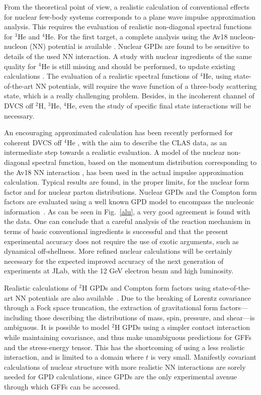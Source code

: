 From the theoretical point of view, a realistic calculation 
of conventional effects for
nuclear few-body systems corresponds to a plane wave impulse approximation 
 analysis. This requires the evaluation of realistic non-diagonal spectral
functions for $^3$He and $^4$He.
For the first target, a complete analysis using the Av18
nucleon-nucleon (NN) potential is available
\cite{Scopetta:2009sn,Rinaldi:2012pj,
Rinaldi:2012ft,Rinaldi:2014bba,Scopetta:2004kj}.
Nuclear GPDs are found to be sensitive to details of 
the used NN interaction.
A study with nuclear ingredients of the same quality
for $^4$He is still missing and should be performed, to update 
existing calculations \cite{Guzey:2003jh,Liuti:2005gi}. 
The evaluation of a realistic spectral functions of $^4$He,
using state-of-the-art NN potentials,
will require the wave function of a three-body scattering state, 
which is a really challenging problem.
Besides, in the incoherent channel of DVCS off $^2$H, $^3$He, $^4$He,
even the study of specific final state interactions will be necessary.

An encouraging approximated calculation has been recently
performed for coherent DVCS off $^4$He \cite{PhysRevC.98.015203}, with the aim to
describe the CLAS data, as an intermediate
step towards a realistic evaluation.
A model of the nuclear non-diagonal spectral function, 
based on the momentum distribution
corresponding to the Av18 NN interaction
\cite{PhysRevC.67.034003}, has been used in the 
actual impulse approximation
calculation. Typical results
are found, in the proper limits, for the nuclear form factor
and for nuclear parton distributions.
Nuclear GPDs and the
Compton form factors are evaluated using
a well known GPD model to encompass the nucleonic information~\cite{Goloskokov:2011rd}. 
As can be seen in Fig.~\ref{alu}, a very good agreement 
is found with the data.  
One can conclude that 
a careful analysis of the reaction mechanism in terms of
basic conventional ingredients is successful and that
the present experimental accuracy does not require
the use of exotic arguments, such as dynamical off-shellness.
More refined nuclear calculations will be certainly necessary for 
the expected improved accuracy of the next generation of experiments 
at JLab, with the 12 GeV electron beam and high luminosity. 

Realistic calculations of $^2$H GPDs and Compton form factors using
state-of-the-art NN potentials are also available~\cite{Cano:2003ju}.
Due to the breaking of Lorentz covariance through a Fock space truncation,
the extraction of gravitational form factors---including those describing
the distributions of mass, spin, pressure, and shear---is ambiguous.
It is possible to model $^2$H GPDs using
a simpler contact interaction while maintaining covariance, and thus
make unambiguous predictions for GFFs and the stress-energy tensor.
This has the shortcoming of using a less realistic interaction,
and is limited to a domain where $t$ is very small. Manifestly covariant
calculations of nuclear structure with more realistic NN interactions
are sorely needed for GPD calculations, since GPDs are the only experimental
avenue through which GFFs can be accessed.
  
